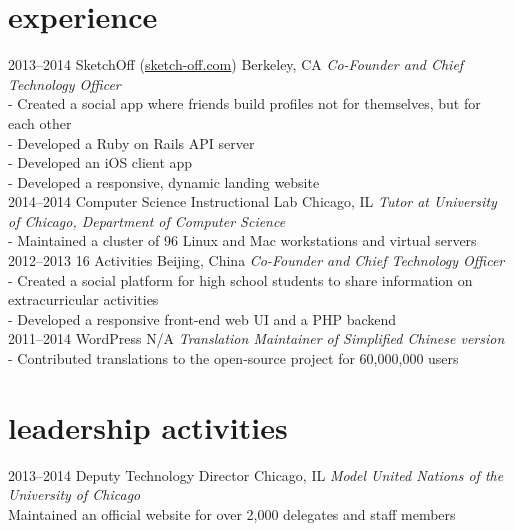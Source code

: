 \section{experience}

\begin{entrylist}
\entry
{2013--2014}
{SketchOff \quad\normalfont (\underline{sketch-off.com})}
{Berkeley, CA}
{\emph{Co-Founder and Chief Technology Officer} \\
- Created a social app where friends build profiles not for themselves, but for each other \\
- Developed a Ruby on Rails API server \\
- Developed an iOS client app \\
- Developed a responsive, dynamic landing website \\}
\entry
{2014--2014}
{Computer Science Instructional Lab}
{Chicago, IL}
{\emph{Tutor at University of Chicago, Department of Computer Science} \\
- Maintained a cluster of 96 Linux and Mac workstations and virtual servers\\}
\entry
{2012--2013}
{16 Activities}
{Beijing, China}
{\emph{Co-Founder and Chief Technology Officer} \\
- Created a social platform for high school students to share information on extracurricular activities \\
- Developed a responsive front-end web UI and a PHP backend \\}
\entry
{2011--2014}
{WordPress}
{N/A}
{\emph{Translation Maintainer of Simplified Chinese version} \\
-   Contributed translations to the open-source project for 60,000,000 users \\}
\end{entrylist}

\section{leadership activities}

\begin{entrylist}
\entry
{2013--2014}
{Deputy Technology Director}
{Chicago, IL}
{\emph{Model United Nations of the University of Chicago} \\
Maintained an official website for over 2,000 delegates and staff members \\}
\end{entrylist}

